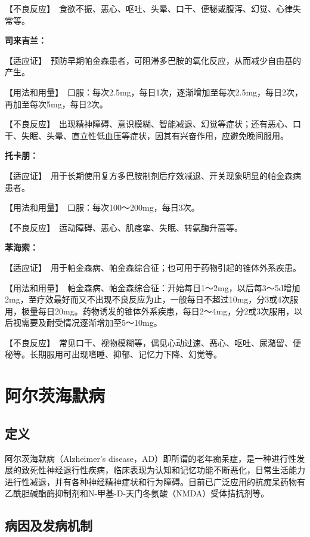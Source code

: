 【不良反应】　食欲不振、恶心、呕吐、头晕、口干、便秘或腹泻、幻觉、心律失常等。

\textbf{司来吉兰：}

【适应证】　预防早期帕金森患者，可阻滞多巴胺的氧化反应，从而减少自由基的产生。

【用法和用量】　口服：每次2.5mg，每日1次，逐渐增加至每次2.5mg，每日2次，再加至每次5mg，每日2次。

【不良反应】　出现精神障碍、意识模糊、智能减退、幻觉等症状；还有恶心、口干、失眠、头晕、直立性低血压等症状，因其有兴奋作用，应避免晚间服用。

\textbf{托卡朋：}

【适应证】　用于长期使用复方多巴胺制剂后疗效减退、开关现象明显的帕金森病患者。

【用法和用量】　口服：每次100～200mg，每日3次。

【不良反应】　运动障碍、恶心、肌痉挛、失眠、转氨酶升高等。

\textbf{苯海索：}

【适应证】　用于帕金森病、帕金森综合征；也可用于药物引起的锥体外系疾患。

【用法和用量】　帕金森病、帕金森综合征：开始每日1～2mg，以后每3～5d增加2mg，至疗效最好而又不出现不良反应为止，一般每日不超过10mg，分3或4次服用，极量每日20mg。药物诱发的锥体外系疾患，每日2～4mg，分2或3次服用，以后视需要及耐受情况逐渐增加至5～10mg。

【不良反应】　常见口干、视物模糊等，偶见心动过速、恶心、呕吐、尿潴留、便秘等。长期服用可出现嗜睡、抑郁、记忆力下降、幻觉等。

\section{阿尔茨海默病}

\subsection{定义}

阿尔茨海默病（Alzheimer's
disease，AD）即所谓的老年痴呆症，是一种进行性发展的致死性神经退行性疾病，临床表现为认知和记忆功能不断恶化，日常生活能力进行性减退，并有各种神经精神症状和行为障碍。目前已广泛应用的抗痴呆药物有乙酰胆碱酯酶抑制剂和N-甲基-D-天门冬氨酸（NMDA）受体拮抗剂等。

\subsection{病因及发病机制}

